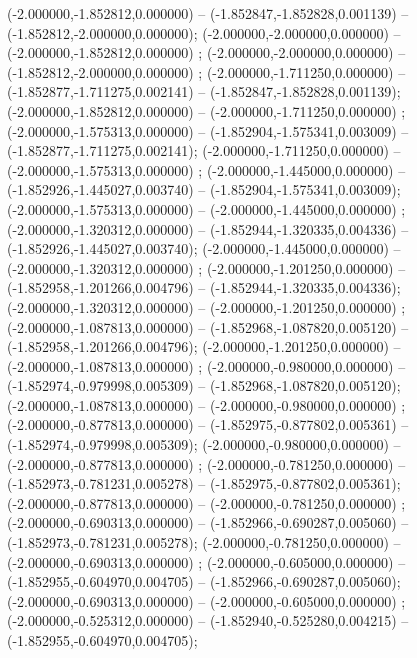  (-2.000000,-1.852812,0.000000) -- (-1.852847,-1.852828,0.001139) -- (-1.852812,-2.000000,0.000000);
 (-2.000000,-2.000000,0.000000) -- (-2.000000,-1.852812,0.000000) ;
 (-2.000000,-2.000000,0.000000) -- (-1.852812,-2.000000,0.000000) ;
 (-2.000000,-1.711250,0.000000) -- (-1.852877,-1.711275,0.002141) -- (-1.852847,-1.852828,0.001139);
 (-2.000000,-1.852812,0.000000) -- (-2.000000,-1.711250,0.000000) ;
 (-2.000000,-1.575313,0.000000) -- (-1.852904,-1.575341,0.003009) -- (-1.852877,-1.711275,0.002141);
 (-2.000000,-1.711250,0.000000) -- (-2.000000,-1.575313,0.000000) ;
 (-2.000000,-1.445000,0.000000) -- (-1.852926,-1.445027,0.003740) -- (-1.852904,-1.575341,0.003009);
 (-2.000000,-1.575313,0.000000) -- (-2.000000,-1.445000,0.000000) ;
 (-2.000000,-1.320312,0.000000) -- (-1.852944,-1.320335,0.004336) -- (-1.852926,-1.445027,0.003740);
 (-2.000000,-1.445000,0.000000) -- (-2.000000,-1.320312,0.000000) ;
 (-2.000000,-1.201250,0.000000) -- (-1.852958,-1.201266,0.004796) -- (-1.852944,-1.320335,0.004336);
 (-2.000000,-1.320312,0.000000) -- (-2.000000,-1.201250,0.000000) ;
 (-2.000000,-1.087813,0.000000) -- (-1.852968,-1.087820,0.005120) -- (-1.852958,-1.201266,0.004796);
 (-2.000000,-1.201250,0.000000) -- (-2.000000,-1.087813,0.000000) ;
 (-2.000000,-0.980000,0.000000) -- (-1.852974,-0.979998,0.005309) -- (-1.852968,-1.087820,0.005120);
 (-2.000000,-1.087813,0.000000) -- (-2.000000,-0.980000,0.000000) ;
 (-2.000000,-0.877813,0.000000) -- (-1.852975,-0.877802,0.005361) -- (-1.852974,-0.979998,0.005309);
 (-2.000000,-0.980000,0.000000) -- (-2.000000,-0.877813,0.000000) ;
 (-2.000000,-0.781250,0.000000) -- (-1.852973,-0.781231,0.005278) -- (-1.852975,-0.877802,0.005361);
 (-2.000000,-0.877813,0.000000) -- (-2.000000,-0.781250,0.000000) ;
 (-2.000000,-0.690313,0.000000) -- (-1.852966,-0.690287,0.005060) -- (-1.852973,-0.781231,0.005278);
 (-2.000000,-0.781250,0.000000) -- (-2.000000,-0.690313,0.000000) ;
 (-2.000000,-0.605000,0.000000) -- (-1.852955,-0.604970,0.004705) -- (-1.852966,-0.690287,0.005060);
 (-2.000000,-0.690313,0.000000) -- (-2.000000,-0.605000,0.000000) ;
 (-2.000000,-0.525312,0.000000) -- (-1.852940,-0.525280,0.004215) -- (-1.852955,-0.604970,0.004705);
